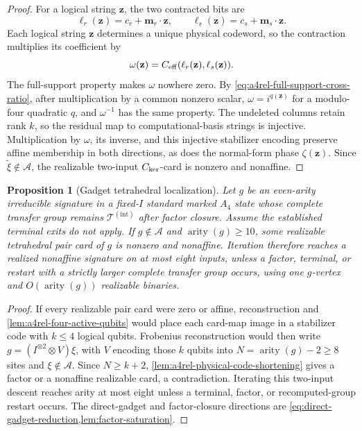 \documentclass[11pt,letterpaper,onecolumn]{article}
\theoremstyle{plain}
\newtheorem{proposition}[proposition]{Proposition}
\theoremstyle{definition}
\theoremstyle{remark}
\newcommand{\cA}{\mathscr A}
\newcommand{\TetInt}{{\mathcal T^{(\mathrm{int})}}}
\newcommand{\arity}{\operatorname{arity}}
\begin{document}
\begin{proof}
For a logical string \({\mathbf z}\), the two contracted bits are
\[
 \ell_r({\mathbf z})=c_r+{\mathbf{m}}_r\cdot {\mathbf z},\qquad
 \ell_s({\mathbf z})=c_s+{\mathbf{m}}_s\cdot {\mathbf z}.
\]
Each logical string \({\mathbf z}\) determines a unique physical codeword, so
the contraction multiplies its coefficient by
\[
 \omega({\mathbf z})=C_{\rm eff}(\ell_r({\mathbf z}),\ell_s({\mathbf z})).
\]
The full-support property makes \(\omega\) nowhere zero.  By
\cref{eq:a4rel-full-support-cross-ratio}, after multiplication by a common
nonzero scalar, \(\omega=i^{q({\mathbf z})}\) for a modulo-four quadratic \(q\), and
\(\omega^{-1}\) has the same property.  The undeleted columns retain rank
\(k\), so the residual map to computational-basis strings is injective.  Multiplication
by \(\omega\), its inverse, and this injective stabilizer encoding preserve
affine membership in both directions, as does the normal-form phase
\(\zeta({\mathbf z})\).  Since \(\widetilde\xi\notin\cA\), the realizable two-input
\(C_{\rm ker}\)-card is nonzero and nonaffine.
\end{proof}

\begin{proposition}[Gadget tetrahedral localization]
\label{prop:a4rel-required-localization}
Let \(g\) be an even-arity irreducible signature in a fixed-\(I\)
standard marked \(A_4\) state whose complete transfer group remains
\(\TetInt\) after factor closure.  Assume the established terminal
exits do not apply.  If \(g\notin\cA\) and \(\arity(g)\ge10\), some realizable
tetrahedral pair card of \(g\) is nonzero and nonaffine.  Iteration therefore
reaches a realized nonaffine signature on at most eight inputs, unless a factor,
terminal, or restart with a strictly larger complete transfer group occurs, using one \(g\)-vertex and
\(O(\arity(g))\) realizable binaries.
\end{proposition}

\begin{proof}
If every realizable pair card were zero or affine, reconstruction and
\cref{lem:a4rel-four-active-qubits} would place each card-map image in a
stabilizer code with \(k\le4\) logical qubits.  Frobenius reconstruction
would then write \(g=(I^{\otimes2}\otimes V)\xi\), with \(V\) encoding
those \(k\) qubits into \(N=\arity(g)-2\ge8\) sites and
\(\xi\notin\cA\).  Since \(N\ge k+2\),
\cref{lem:a4rel-physical-code-shortening} gives a factor or a nonaffine
realizable card, a contradiction.  Iterating this two-input descent reaches
arity at most eight unless a terminal, factor, or recomputed-group restart
occurs.  The direct-gadget and factor-closure directions are
\cref{eq:direct-gadget-reduction,lem:factor-saturation}.
\end{proof}
\end{document}
